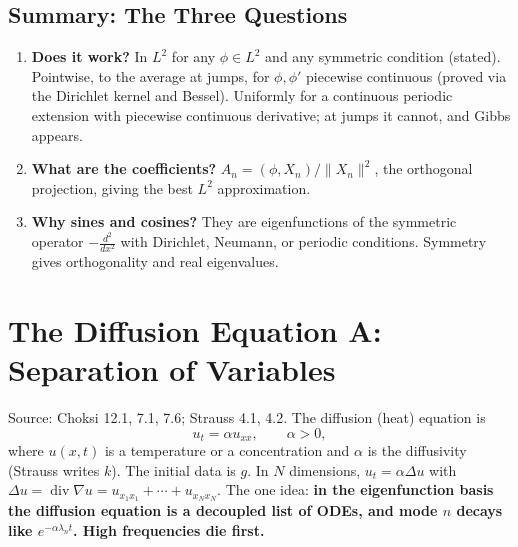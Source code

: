 \documentclass{article}
\begin{document}
\subsection{Summary: The Three Questions}
\begin{enumerate}[label=(\arabic*)]
    \item \textbf{Does it work?} In $L^2$ for any $\phi \in L^2$ and any symmetric condition (stated). Pointwise, to the average at jumps, for $\phi, \phi'$ piecewise continuous (proved via the Dirichlet kernel and Bessel). Uniformly for a continuous periodic extension with piecewise continuous derivative; at jumps it cannot, and Gibbs appears.
    \item \textbf{What are the coefficients?} $A_n = (\phi,X_n)/\|X_n\|^2$, the orthogonal projection, giving the best $L^2$ approximation.
    \item \textbf{Why sines and cosines?} They are eigenfunctions of the symmetric operator $-\frac{d^2}{dx^2}$ with Dirichlet, Neumann, or periodic conditions. Symmetry gives orthogonality and real eigenvalues.
\end{enumerate}


\section{The Diffusion Equation A: Separation of Variables}\label{sec:diffA}
Source: Choksi 12.1, 7.1, 7.6; Strauss 4.1, 4.2. The diffusion (heat) equation is
\begin{equation}\label{eq:heat}
    u_t = \alpha u_{xx}, \qquad \alpha > 0,
\end{equation}
where $u(x,t)$ is a temperature or a concentration and $\alpha$ is the diffusivity (Strauss writes $k$). The initial data is $g$. In $N$ dimensions, $u_t = \alpha\Delta u$ with $\Delta u = \operatorname{div}\nabla u = u_{x_1x_1} + \cdots + u_{x_Nx_N}$. The one idea: \textbf{in the eigenfunction basis the diffusion equation is a decoupled list of ODEs, and mode $n$ decays like $e^{-\alpha\lambda_nt}$. High frequencies die first.}
\end{document}
